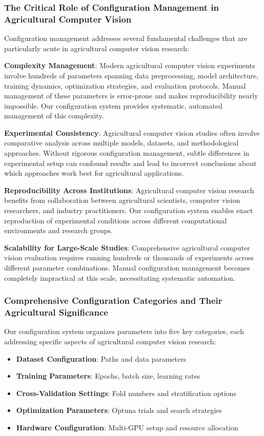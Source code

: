 \subsubsection{The Critical Role of Configuration Management in Agricultural Computer Vision}

Configuration management addresses several fundamental challenges that are particularly acute in agricultural computer vision research:

\textbf{Complexity Management}: Modern agricultural computer vision experiments involve hundreds of parameters spanning data preprocessing, model architecture, training dynamics, optimization strategies, and evaluation protocols. Manual management of these parameters is error-prone and makes reproducibility nearly impossible. Our configuration system provides systematic, automated management of this complexity.

\textbf{Experimental Consistency}: Agricultural computer vision studies often involve comparative analysis across multiple models, datasets, and methodological approaches. Without rigorous configuration management, subtle differences in experimental setup can confound results and lead to incorrect conclusions about which approaches work best for agricultural applications.

\textbf{Reproducibility Across Institutions}: Agricultural computer vision research benefits from collaboration between agricultural scientists, computer vision researchers, and industry practitioners. Our configuration system enables exact reproduction of experimental conditions across different computational environments and research groups.

\textbf{Scalability for Large-Scale Studies}: Comprehensive agricultural computer vision evaluation requires running hundreds or thousands of experiments across different parameter combinations. Manual configuration management becomes completely impractical at this scale, necessitating systematic automation.

\subsubsection{Comprehensive Configuration Categories and Their Agricultural Significance}

Our configuration system organizes parameters into five key categories, each addressing specific aspects of agricultural computer vision research:

\begin{itemize}
    \item \textbf{Dataset Configuration}: Paths and data parameters
    \item \textbf{Training Parameters}: Epochs, batch size, learning rates
    \item \textbf{Cross-Validation Settings}: Fold numbers and stratification options
    \item \textbf{Optimization Parameters}: Optuna trials and search strategies
    \item \textbf{Hardware Configuration}: Multi-GPU setup and resource allocation
\end{itemize}

